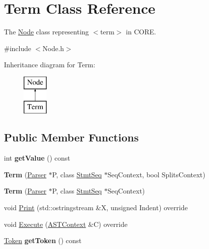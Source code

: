 \hypertarget{class_term}{}\section{Term Class Reference}
\label{class_term}


The \mbox{\hyperlink{class_node}{Node}} class representing {\ttfamily $<$term$>$} in C\+O\+RE.  




{\ttfamily \#include $<$Node.\+h$>$}

Inheritance diagram for Term\+:\begin{figure}[H]
\begin{center}
\leavevmode
\includegraphics[height=2.000000cm]{class_term}
\end{center}
\end{figure}
\subsection*{Public Member Functions}
\begin{DoxyCompactItemize}
\item 
\mbox{\label{class_term_abaddcf953573853a7fa95fe7bca4a27c}} 
int {\bfseries get\+Value} () const
\item 
\mbox{\label{class_term_a61ab0c553c63ce2b07b1312a7f441e6c}} 
{\bfseries Term} (\mbox{\hyperlink{class_parser}{Parser}} $\ast$P, class \mbox{\hyperlink{class_stmt_seq}{Stmt\+Seq}} $\ast$Seq\+Context, bool Splits\+Context)
\item 
\mbox{\label{class_term_a965c10d83e5ed18a34fc05f29c966d7e}} 
{\bfseries Term} (\mbox{\hyperlink{class_parser}{Parser}} $\ast$P, class \mbox{\hyperlink{class_stmt_seq}{Stmt\+Seq}} $\ast$Seq\+Context)
\item 
void \mbox{\hyperlink{class_term_a36f292dd7bd0d04cb97ca97afd476fc7}{Print}} (std\+::ostringstream \&X, unsigned Indent) override
\item 
void \mbox{\hyperlink{class_term_aca584601256c9ccb79b5936907b7bf30}{Execute}} (\mbox{\hyperlink{class_a_s_t_context}{A\+S\+T\+Context}} \&C) override
\item 
\mbox{\label{class_term_a63238ed52d795eeac4319d1488149b3c}} 
\mbox{\hyperlink{class_token}{Token}} {\bfseries get\+Token} () const
\end{DoxyCompactItemize}
